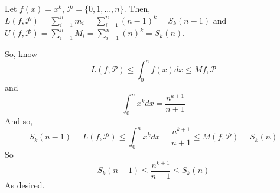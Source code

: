 \documentclass{article}
\newcommand{\parti}{\mathcal{P}}
\begin{document}
Let $f(x) = x^{k}$, $\mathcal{P} = \{0, 1, ... ,n\}$. Then, $L(f, \parti) = \sum_{i=1}^{n} m_{i} =  \sum_{i=1}^{n} (n-1)^{k} = S_{k}(n-1)$ and $U(f, \parti) = \sum_{i=1}^{n} M_{i} = \sum_{i=1}^{n} (n)^{k} = S_{k}(n)$.

So, know
\begin{equation*}
L(f, \parti) \leq \int_{0}^{n} f(x)dx \leq M{f, \parti}
\end{equation*}
and 
\begin{equation*}
\int_{0}^{n} x^{k}dx = \frac{n^{k+1}}{n+1}
\end{equation*}
And so, 
\begin{equation*}
S_{k}(n-1) = L(f, \parti) \leq \int_{0}^{n} x^{k}dx = \frac{n^{k+1}}{n+1} \leq M(f, \parti) = S_{k}(n)
\end{equation*}
So 
\begin{equation*}
S_{k}(n-1) \leq  \frac{n^{k+1}}{n+1} \leq S_{k}(n)
\end{equation*}
As desired.
\end{document}
